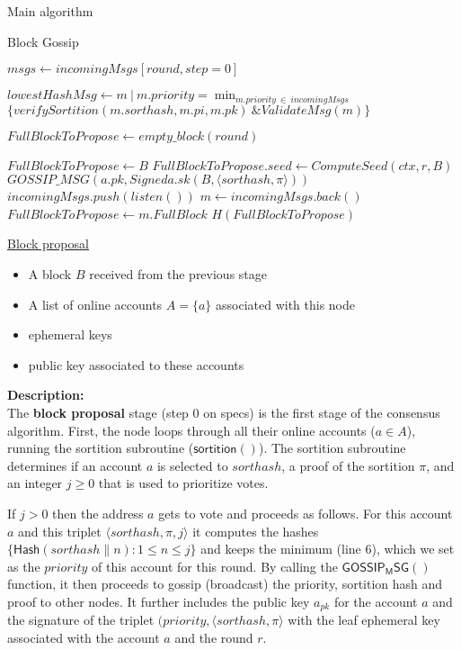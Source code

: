 \documentclass[10pt,a4paper]{article}
\begin{document}
\begin{section}{Main algorithm}
\begin{subsection}{Block Gossip}
\begin{algorithm}
\begin{algorithmic}[1]
        \State $msgs \gets incomingMsgs[round, step=0]$

        \State $lowestHashMsg \gets m\ |\ m.priority = \min_{m.priority\ \in\ incomingMsgs}$ \newline
        ${\{verifySortition(m.sorthash, m.pi, m.pk)\ \& ValidateMsg(m)\}}$

        \State $FullBlockToPropose \gets empty\_block(round)$

            \State $FullBlockToPropose \gets B$
            \State $FullBlockToPropose.seed \gets ComputeSeed(ctx, r, B)$
            \State $GOSSIP\_MSG(a.pk, Signed{a.sk}(B, \langle sorthash, \pi \rangle))$
        \Else
        {
                \State $incomingMsgs.push(listen())$
                \State $m \gets incomingMsgs.back()$
                    \State $FullBlockToPropose \gets m.FullBlock$
                \EndIf
            \EndWhile
        }
        \EndIf
        \Return $H(FullBlockToPropose)$
    \EndFunction
    \end{algorithmic}
    \caption{\underline{Block proposal}}
\end{algorithm}

\newpage
{}
\begin{itemize}
    \item A block $B$ received from the previous stage
    \item A list of online accounts  $A=\{a\}$ associated with this node
    \item ephemeral keys
    \item public key associated to these accounts
  \end{itemize}
\noindent \textbf{Description:}\\
The {\bf block proposal} stage (step 0 on specs) is the first stage of the 
consensus algorithm. 
First, the node loops through all their online accounts ($a\in A$), 
running the sortition subroutine ($\mathsf{sortition}()$).
The sortition subroutine determines if an account $a$ is selected to 
${sorthash}$, a proof of the sortition $\pi$, and an integer $j\ge 0$
that is used to prioritize votes.

If $j>0$ then the address $a$ gets to vote and proceeds as follows.
For this account $a$ and this triplet $\langle sorthash, \pi, j\rangle$
it computes the hashes $\{ \mathsf{Hash}(sorthash \| n):1\le n\le j\}$
and keeps the minimum (line 6), which we set as the $priority$ of this
account for this round. 
By calling the $\mathsf{GOSSIP_MSG}()$ function, it then proceeds to gossip
(broadcast) the priority, sortition hash and proof to other nodes.
It further includes the public key $a_{pk}$ for the account $a$ and the
signature of the triplet $(priority, \langle sorthash, \pi\rangle$ with the 
leaf ephemeral key associated with the account $a$ and the round $r$.


\end{subsection}
\end{section}
\end{document}
